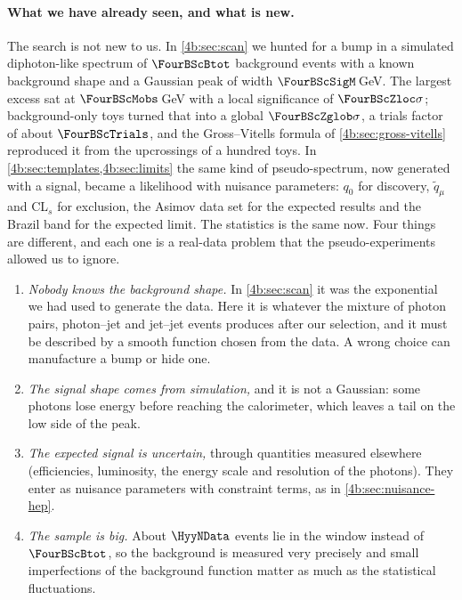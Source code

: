 \paragraph{What we have already seen, and what is new.}
The search is not new to us. In \cref{4b:sec:scan} we hunted for a bump in a simulated
diphoton-like spectrum of $\FourBScBtot$ background events with a known background shape
and a Gaussian peak of width $\FourBScSigM\,$GeV. The largest excess sat at
$\FourBScMobs\,$GeV with a local significance of $\FourBScZloc\sigma$; background-only
toys turned that into a global $\FourBScZglob\sigma$, a trials factor of about
$\FourBScTrials$, and the Gross--Vitells formula of \cref{4b:sec:gross-vitells} reproduced
it from the upcrossings of a hundred toys. In \cref{4b:sec:templates,4b:sec:limits} the
same kind of pseudo-spectrum, now generated with a signal, became a likelihood with
nuisance parameters: $q_0$ for discovery, $\tilde q_\mu$ and CL$_s$ for exclusion, the
Asimov data set for the expected results and the Brazil band for the expected limit. The
statistics is the same now. Four things are different, and each one is a real-data
problem that the pseudo-experiments allowed us to ignore.
\begin{enumerate}[label=\arabic*.]
  \item \emph{Nobody knows the background shape.} In \cref{4b:sec:scan} it was the
        exponential we had used to generate the data. Here it is whatever the mixture of
        photon pairs, photon--jet and jet--jet events produces after our selection, and it
        must be described by a smooth function chosen from the data. A wrong choice can
        manufacture a bump or hide one.
  \item \emph{The signal shape comes from simulation,} and it is not a Gaussian: some
        photons lose energy before reaching the calorimeter, which leaves a tail on the low
        side of the peak.
  \item \emph{The expected signal is uncertain,} through quantities measured elsewhere
        (efficiencies, luminosity, the energy scale and resolution of the photons). They
        enter as nuisance parameters with constraint terms, as in \cref{4b:sec:nuisance-hep}.
  \item \emph{The sample is big.} About $\HyyNData$ events lie in the window instead of
        $\FourBScBtot$, so the background is measured very precisely and small
        imperfections of the background function matter as much as the statistical
        fluctuations.
\end{enumerate}

